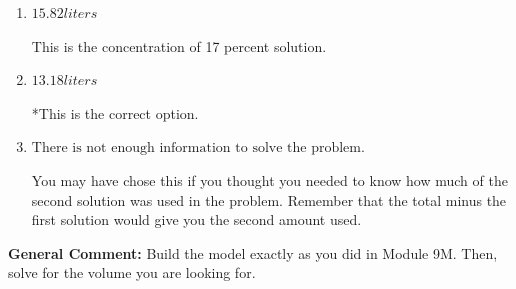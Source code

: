 \documentclass{extbook}[14pt]
\begin{document}
\begin{enumerate}
{\begin{enumerate}[label=\Alph*.]
This would be correct if Brittany used equal parts of each solution.
\item \( 15.82 liters \)

This is the concentration of 17 percent solution.
\item \( 13.18 liters \)

*This is the correct option.
\item \( \text{There is not enough information to solve the problem.} \)

You may have chose this if you thought you needed to know how much of the second solution was used in the problem. Remember that the total minus the first solution would give you the second amount used.
\end{enumerate}

\textbf{General Comment:} Build the model exactly as you did in Module 9M. Then, solve for the volume you are looking for.
}
\end{enumerate}
\end{document}
